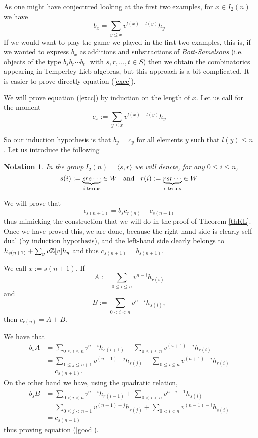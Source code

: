 \documentclass[12pt]{wart}
\newtheorem{nota}[thm]{Notation}
\theoremstyle{remark}
\begin{document}
As one might have conjectured looking at the first two examples, for $x\in I_2(n)$ we have
\begin{equation}\label{excc}b_x= \sum_{y\leq x}v^{l(x)-l(y)}h_y\end{equation}
If we would want to play the game we played in the first two examples, this is, if we wanted to express $b_x$ as additions and substractions of \emph{Bott-Samelsons} (i.e. objects of the type $b_sb_r\cdots b_t,$ with $s,r,\ldots, t\in S$) then we obtain the combinatorics appearing in Temperley-Lieb algebras, but this approach is a bit complicated. It is  easier to  prove directly  equation (\ref{excc}).

 We will prove equation (\ref{excc}) by induction on the length of $x$. Let us call for the moment \begin{equation*}\label{exc}c_x:= \sum_{y\leq x}v^{l(x)-l(y)}h_y\end{equation*}
 
 So our induction hypothesis is that $b_y=c_y$ for all elements $y$ such that $l(y)\leq n$. Let us introduce the following 

\begin{nota} In the group $I_2(n)=\langle s,r \rangle $ we will denote, for any $0\leq i\leq n$,   $$s(i):=\underbrace{srs\cdots}_{i\ \mathrm{terms}}\in W \hspace{.3cm}  \mathrm{and} \hspace{.3cm} r(i):=\underbrace{rsr\cdots}_{i\  \mathrm{terms}} \in W  $$
\end{nota}
We will prove that 
\begin{equation}\label{good}
c_{s(n+1)}=b_sc_{r(n)}-c_{s(n-1)}
\end{equation}
thus mimicking the construction that we will do in the proof of Theorem \ref{thKL}. Once we have proved this, we are done, because the right-hand side is clearly self-dual (by induction hypothesis), and the left-hand side clearly belongs to $h_{s(n+1)}+\sum_yv\mathbb Z[v]h_y$ and thus $c_{s(n+1)}=b_{s(n+1)}$.


We call $x:=s(n+1).$  If $$A:=\sum_{0\leq i \leq n}v^{n-i}h_{r(i)}$$ and 
$$B:=\sum_{0< i < n}v^{n-i}h_{s(i)},$$
then $c_{r(n)}=A+B.$

We have that 
\begin{align*}
b_sA&=\sum_{0\leq i \leq n}v^{n-i}h_{s(i+1)}+\sum_{0\leq i \leq n}v^{(n+1)-i}h_{r(i)}\\
&=  \sum_{1\leq j \leq n+1}v^{(n+1)-j}h_{s(j)} +\sum_{0\leq i \leq n}v^{(n+1)-i}h_{r(i)}\\
&=c_{s(n+1)}.
\end{align*}
On the other hand we have, using the quadratic relation, 
\begin{align*}
b_sB&=\sum_{0< i < n}v^{n-i}h_{r(i-1)}+\sum_{0< i < n}v^{n-i-1}h_{s(i)}\\
&=   \sum_{0\leq j < n-1}v^{(n-1)-j}h_{r(j)}+\sum_{0< i < n}v^{(n-1)-i}h_{s(i)} \\
&=    c_{s(n-1)}
\end{align*}
  thus proving equation (\ref{good}).
\end{document}
